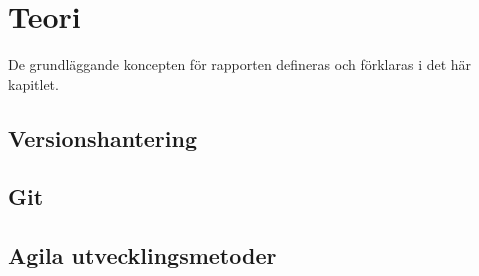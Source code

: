 \section{Teori}
\label{sec:bjorn-theory}
De grundläggande koncepten för rapporten defineras och förklaras i det här kapitlet.

\subsection{Versionshantering}

\subsection{Git}

\subsection{Agila utvecklingsmetoder}